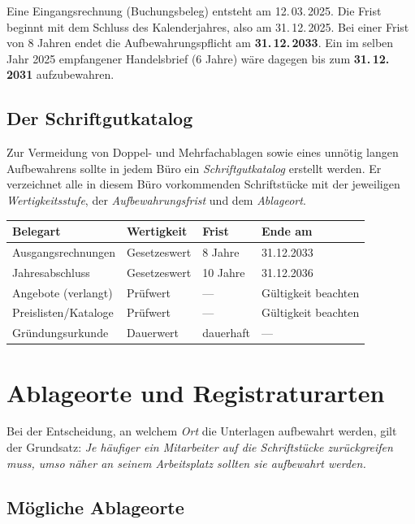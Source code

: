 \documentclass[11pt, a4paper]{article}
\begin{document}
\begin{beispiel}
Eine Eingangsrechnung (Buchungsbeleg) entsteht am 12.\,03.\,2025. Die Frist beginnt mit
dem Schluss des Kalenderjahres, also am 31.\,12.\,2025. Bei einer Frist von 8 Jahren endet
die Aufbewahrungspflicht am \textbf{31.\,12.\,2033}. Ein im selben Jahr 2025 empfangener
Handelsbrief (6 Jahre) wäre dagegen bis zum \textbf{31.\,12.\,2031} aufzubewahren.
\end{beispiel}

\subsection{Der Schriftgutkatalog}

Zur Vermeidung von Doppel- und Mehrfachablagen sowie eines unnötig langen Aufbewahrens
sollte in jedem Büro ein \emph{Schriftgutkatalog} erstellt werden. Er verzeichnet alle
in diesem Büro vorkommenden Schriftstücke mit der jeweiligen \emph{Wertigkeitsstufe},
der \emph{Aufbewahrungsfrist} und dem \emph{Ablageort}.

\begin{center}
\begin{tabular}{p{3.4cm} p{3.0cm} p{2.0cm} p{3.0cm}}
\toprule
\textbf{Belegart} & \textbf{Wertigkeit} & \textbf{Frist} & \textbf{Ende am}\\
\midrule
Ausgangsrechnungen & Gesetzeswert & 8 Jahre & 31.12.2033\\
Jahresabschluss & Gesetzeswert & 10 Jahre & 31.12.2036\\
Angebote (verlangt) & Prüfwert & --- & Gültigkeit beachten\\
Preislisten/Kataloge & Prüfwert & --- & Gültigkeit beachten\\
Gründungsurkunde & Dauerwert & dauerhaft & ---\\
\bottomrule
\end{tabular}
\end{center}

\section{Ablageorte und Registraturarten}

Bei der Entscheidung, an welchem \emph{Ort} die Unterlagen aufbewahrt werden, gilt der
Grundsatz: \emph{Je häufiger ein Mitarbeiter auf die Schriftstücke zurückgreifen muss,
umso näher an seinem Arbeitsplatz sollten sie aufbewahrt werden.}

\subsection{Mögliche Ablageorte}
\end{document}
